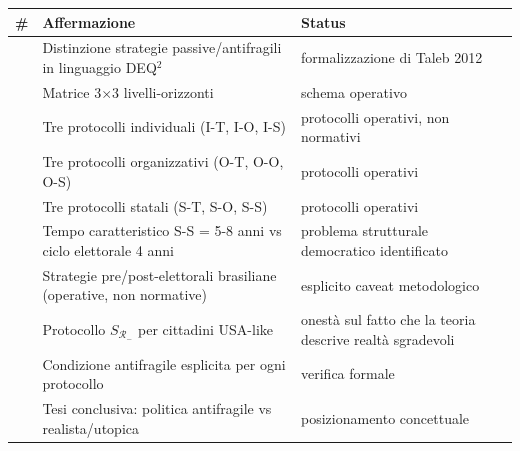 {\def\LTcaptype{none} %
{\small\begin{longtable}[]{@{}
  >{\raggedright\arraybackslash}p{}
  >{\raggedright\arraybackslash}p{}
  >{\raggedright\arraybackslash}p{}@{}}
\toprule\noalign{}
\begin{minipage}[b]{\linewidth}\raggedright
\#
\end{minipage} & \begin{minipage}[b]{\linewidth}\raggedright
Affermazione
\end{minipage} & \begin{minipage}[b]{\linewidth}\raggedright
Status
\end{minipage} \\
\midrule\noalign{}
\endhead
\bottomrule\noalign{}
\endlastfoot
1 & Distinzione strategie passive/antifragili in linguaggio DEQ$^2$ &
\Hypoth{} formalizzazione di Taleb 2012 \\
2 & Matrice 3$\times$3 livelli-orizzonti & \Hypoth{} schema operativo \\
3 & Tre protocolli individuali (I-T, I-O, I-S) & \Hypoth{} protocolli
operativi, non normativi \\
4 & Tre protocolli organizzativi (O-T, O-O, O-S) & \Hypoth{} protocolli
operativi \\
5 & Tre protocolli statali (S-T, S-O, S-S) & \Hypoth{} protocolli
operativi \\
6 & Tempo caratteristico S-S = 5-8 anni vs ciclo elettorale 4 anni &
\Hypoth{} problema strutturale democratico identificato \\
7 & Strategie pre/post-elettorali brasiliane (operative, non normative)
& \Hypoth{} esplicito caveat metodologico \\
8 & Protocollo \(S_{\mathcal{R}_-}\) per cittadini USA-like & \Hypoth{}
onestà sul fatto che la teoria descrive realtà sgradevoli \\
9 & Condizione antifragile esplicita per ogni protocollo & \Hypoth{}
verifica formale \\
10 & Tesi conclusiva: politica antifragile vs realista/utopica &
\Hypoth{} posizionamento concettuale \\
\end{longtable}}
}


